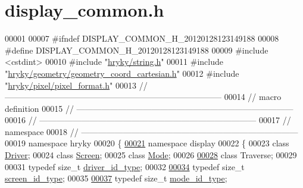 \hypertarget{display__common_8h_source}{\section{display\-\_\-common.\-h}
}

\begin{DoxyCode}
00001 
00007 \textcolor{preprocessor}{#ifndef DISPLAY\_COMMON\_H\_20120128123149188}
00008 \textcolor{preprocessor}{}\textcolor{preprocessor}{#define DISPLAY\_COMMON\_H\_20120128123149188}
00009 \textcolor{preprocessor}{}\textcolor{preprocessor}{#include <cstdint>}
00010 \textcolor{preprocessor}{#include "\hyperlink{string_8h}{hryky/string.h}"}
00011 \textcolor{preprocessor}{#include "\hyperlink{geometry__coord__cartesian_8h}{hryky/geometry/geometry_coord_cartesian.h}"}
00012 \textcolor{preprocessor}{#include "\hyperlink{pixel__format_8h}{hryky/pixel/pixel_format.h}"}
00013 \textcolor{comment}{//
      ------------------------------------------------------------------------------}
00014 \textcolor{comment}{// macro definition}
00015 \textcolor{comment}{//
      ------------------------------------------------------------------------------}
00016 \textcolor{comment}{//
      ------------------------------------------------------------------------------}
00017 \textcolor{comment}{// namespace}
00018 \textcolor{comment}{//
      ------------------------------------------------------------------------------}
00019 \textcolor{keyword}{namespace }hryky
00020 \{
\hypertarget{display__common_8h_source_l00021}{}\hyperlink{namespacehryky_1_1display}{00021} \textcolor{keyword}{namespace }display
00022 \{
00023     \textcolor{keyword}{class }\hyperlink{classhryky_1_1display_1_1_driver}{Driver};
00024     \textcolor{keyword}{class }\hyperlink{classhryky_1_1display_1_1_screen}{Screen};
00025     \textcolor{keyword}{class }\hyperlink{classhryky_1_1display_1_1_mode}{Mode};
00026 
\hypertarget{display__common_8h_source_l00028}{}\hyperlink{namespacehryky_1_1display_a438d20137cf00d71a4a72dfb7233ec90}{00028}     \textcolor{keyword}{class }Traverse;
00029 
00031     \textcolor{keyword}{typedef} \textcolor{keywordtype}{size\_t} \hyperlink{namespacehryky_1_1display_a438d20137cf00d71a4a72dfb7233ec90}{driver_id_type};
00032     
\hypertarget{display__common_8h_source_l00034}{}\hyperlink{namespacehryky_1_1display_a09f7398edae025e4ee4e505b5cdf954c}{00034}     \textcolor{keyword}{typedef} \textcolor{keywordtype}{size\_t} \hyperlink{namespacehryky_1_1display_a09f7398edae025e4ee4e505b5cdf954c}{screen_id_type};
00035 
\hypertarget{display__common_8h_source_l00037}{}\hyperlink{namespacehryky_1_1display_a4f58c27b579f6370a813f2ac7f07c8f4}{00037}     \textcolor{keyword}{typedef} \textcolor{keywordtype}{size\_t} \hyperlink{namespacehryky_1_1display_a4f58c27b579f6370a813f2ac7f07c8f4}{mode_id_type};

\end{DoxyCode}
